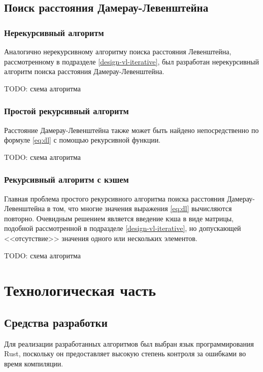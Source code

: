 \documentclass{report}
\begin{document}
\section{Поиск расстояния Дамерау-Левенштейна}

\subsection{Нерекурсивный алгоритм}

Аналогично нерекурсивному алгоритму поиска расстояния Левенштейна,
рассмотренному в подразделе \ref{design-vl-iterative}, был
разработан нерекурсивный алгоритм поиска расстояния
Дамерау-Левенштейна.

TODO: схема алгоритма

\subsection{Простой рекурсивный алгоритм}

Расстояние Дамерау-Левенштейна также может быть найдено
непосредственно по формуле \ref{eq:dl} с помощью рекурсивной
функции.

TODO: схема алгоритма

\subsection{Рекурсивный алгоритм с кэшем}

Главная проблема простого рекурсивного алгоритма поиска расстояния
Дамерау-Левенштейна в том, что многие значения выражения
\ref{eq:dl} вычисляются повторно. Очевидным решением является
введение кэша в виде матрицы, подобной рассмотренной в подразделе
\ref{design-vl-iterative}, но допускающей <<отсутствие>> значения
одного или нескольких элементов.

TODO: схема алгоритма

\chapter{Технологическая часть}

\section{Средства разработки}

Для реализации разработанных алгоритмов был выбран язык
программирования Rust, поскольку он предоставляет высокую степень
контроля за ошибками во время компиляции.
\end{document}
